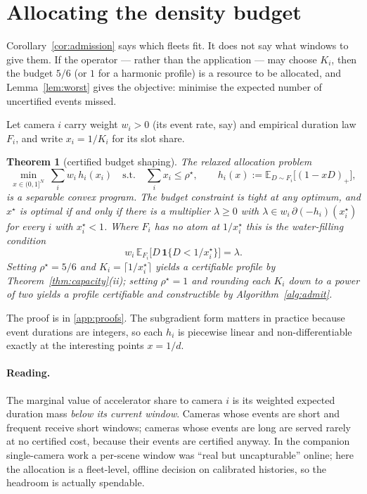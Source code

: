 \documentclass[preprint,review,12pt]{elsarticle}
\newtheorem{theorem}{Theorem}
\theoremstyle{definition}
\newcommand{\Nc}{N}
\newcommand{\Ki}{K_i}
\newcommand{\dens}{\rho}
\newcommand{\Dur}{D}
\newcommand{\pos}[1]{(#1)_{+}}
\begin{document}
\section{Allocating the density budget}\label{sec:shaping}

Corollary~\ref{cor:admission} says which fleets fit. It does not say what windows to give them.
If the operator --- rather than the application --- may choose $\Ki$, then the budget $5/6$ (or
$1$ for a harmonic profile) is a resource to be allocated, and Lemma~\ref{lem:worst} gives the
objective: minimise the expected number of uncertified events missed.

Let camera $i$ carry weight $w_i>0$ (its event rate, say) and empirical duration law $F_i$, and
write $x_i=1/\Ki$ for its slot share.

\begin{theorem}[certified budget shaping]\label{thm:shaping}
The relaxed allocation problem
\[
\min_{x\in(0,1]^\Nc}\ \sum_i w_i\,h_i(x_i)
\quad\text{s.t.}\quad \sum_i x_i\le\dens^{\star},
\qquad h_i(x):=\mathbb{E}_{\Dur\sim F_i}\!\big[\pos{1-x\Dur}\big],
\]
is a separable convex program. The budget constraint is tight at any optimum, and $x^\star$ is
optimal if and only if there is a multiplier $\lambda\ge0$ with
$\lambda\in w_i\,\partial(-h_i)(x_i^\star)$ for every $i$ with $x_i^\star<1$. Where $F_i$ has no
atom at $1/x_i^\star$ this is the water-filling condition
\[
w_i\,\mathbb{E}_{F_i}\!\big[\Dur\,\mathbf 1\{\Dur<1/x_i^\star\}\big]=\lambda .
\]
Setting $\dens^{\star}=5/6$ and $\Ki=\lceil 1/x_i^\star\rceil$ yields a certifiable profile by
Theorem~\ref{thm:capacity}(ii); setting $\dens^{\star}=1$ and rounding each $\Ki$ down to a power
of two yields a profile certifiable \emph{and} constructible by Algorithm~\ref{alg:admit}.
\end{theorem}

The proof is in \ref{app:proofs}. The subgradient form matters in practice because event durations
are integers, so each $h_i$ is piecewise linear and non-differentiable exactly at the interesting
points $x=1/d$.

\paragraph{Reading.} The marginal value of accelerator share to camera $i$ is its weighted expected
duration mass \emph{below its current window}. Cameras whose events are short and frequent receive
short windows; cameras whose events are long are served rarely at no certified cost, because their
events are certified anyway. In the companion single-camera work a per-scene window was ``real but
uncapturable'' online; here the allocation is a fleet-level, offline decision on calibrated
histories, so the headroom is actually spendable.
\end{document}
